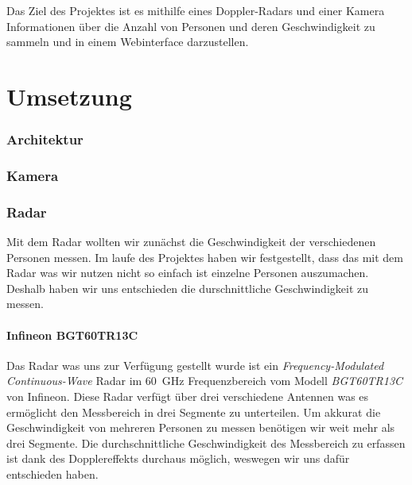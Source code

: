 \documentclass[report]{scrartcl}
\begin{document}
Das Ziel des Projektes ist es mithilfe eines Doppler-Radars und einer Kamera
Informationen über die Anzahl von Personen und deren Geschwindigkeit zu sammeln
und in einem Webinterface darzustellen.

\part{Umsetzung}

\section{Architektur}



\section{Kamera}



\section{Radar}


Mit dem Radar wollten wir zunächst die Geschwindigkeit der verschiedenen
Personen messen. Im laufe des Projektes haben wir festgestellt, dass das mit
dem Radar was wir nutzen nicht so einfach ist einzelne Personen auszumachen.
Deshalb haben wir uns entschieden die durschnittliche Geschwindigkeit zu
messen.

\subsection{Infineon BGT60TR13C}

Das Radar was uns zur Verfügung gestellt wurde ist ein
\textit{Frequency-Modulated Continuous-Wave} Radar im \qty{60}{\giga\hertz}
Frequenzbereich vom Modell \textit{BGT60TR13C} von Infineon. Diese Radar
verfügt über drei verschiedene Antennen was es ermöglicht den Messbereich in
drei Segmente zu unterteilen. Um akkurat die Geschwindigkeit von mehreren
Personen zu messen benötigen wir weit mehr als drei Segmente. Die
durchschnittliche Geschwindigkeit des Messbereich zu erfassen ist dank des
Dopplereffekts durchaus möglich, weswegen wir uns dafür entschieden haben.
\end{document}
